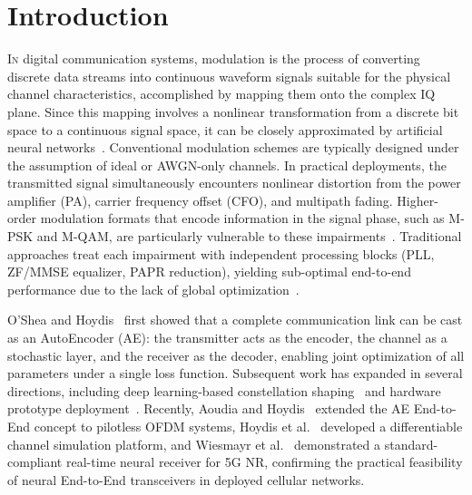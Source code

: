 \documentclass{JECnew}
\begin{document}
\makeatletter
\def\ps@firstpage{%
  \def\@oddfoot{\hfill\scriptsize 1859-378X--2025-xxxx~\copyright~2025 REV\hfill}%
  \def\@evenfoot{\hfill\scriptsize 1859-378X--2025-xxxx~\copyright~2025 REV\hfill}%
}
\makeatother
\thispagestyle{firstpage}

\renewcommand{\leftmark}{{\small REV Journal on Electronics and Communications: \textit{Article scheduled for publication}}}
\renewcommand{\rightmark}{\small \textbf{Lai \MakeLowercase{\textit{et al.}}:} Intelligent AutoEncoder-Based Modulation}


\section{Introduction}

\lettrine[lines=2, loversize=0.15, findent=0.1em]{I}{n} digital communication systems, modulation is the process of converting discrete data streams into continuous waveform signals suitable for the physical channel characteristics, accomplished by mapping them onto the complex IQ plane. Since this mapping involves a nonlinear transformation from a discrete bit space to a continuous signal space, it can be closely approximated by artificial neural networks~\cite{hornik1991}. Conventional modulation schemes are typically designed under the assumption of ideal or AWGN-only channels. In practical deployments, the transmitted signal simultaneously encounters nonlinear distortion from the power amplifier (PA), carrier frequency offset (CFO), and multipath fading. Higher-order modulation formats that encode information in the signal phase, such as M-PSK and M-QAM, are particularly vulnerable to these impairments~\cite{proakis2008}. Traditional approaches treat each impairment with independent processing blocks (PLL, ZF/MMSE equalizer, PAPR reduction), yielding sub-optimal end-to-end performance due to the lack of global optimization~\cite{oshea2017}.

O'Shea and Hoydis~\cite{oshea2017} first showed that a complete communication link can be cast as an AutoEncoder (AE): the transmitter acts as the encoder, the channel as a stochastic layer, and the receiver as the decoder, enabling joint optimization of all parameters under a single loss function. Subsequent work has expanded in several directions, including {\color{blue}deep learning-based constellation shaping~\cite{stark2019} and hardware prototype deployment~\cite{cammerer2020}. Recently, Aoudia and Hoydis~\cite{aoudia2022} extended the AE End-to-End concept to pilotless OFDM systems, Hoydis et al.~\cite{hoydis2024} developed a differentiable channel simulation platform, and Wiesmayr et al.~\cite{wiesmayr2025} demonstrated a standard-compliant real-time neural receiver for 5G NR, confirming the practical feasibility of neural End-to-End transceivers in deployed cellular networks.}
\end{document}
